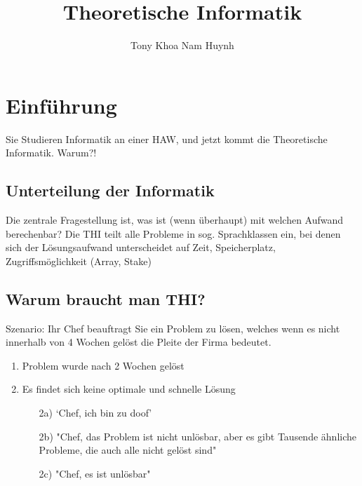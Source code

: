 \documentclass[11pt, a4paper]{article}
\title{Theoretische Informatik}
\author{Tony Khoa Nam Huynh}
\begin{document}
\maketitle
\thispagestyle{empty}   %

\newpage

\tableofcontents

\newpage

\section{Einführung}

Sie Studieren Informatik an einer HAW, und jetzt kommt die Theoretische Informatik.
Warum?!

\subsection{Unterteilung der Informatik}


Die zentrale Fragestellung ist, was ist (wenn überhaupt) mit welchen Aufwand berechenbar? Die THI teilt alle Probleme in sog. Sprachklassen ein, bei denen sich der Lösungsaufwand unterscheidet auf Zeit, Speicherplatz, Zugriffsmöglichkeit (Array, Stake)

\subsection{Warum braucht man THI?}

Szenario: Ihr Chef beauftragt Sie ein Problem zu lösen, welches wenn es nicht innerhalb von 4 Wochen gelöst die Pleite der Firma bedeutet.

\begin{enumerate}[1)]
    \item Problem wurde nach 2 Wochen gelöst
    \item Es findet sich keine optimale und schnelle Lösung
          \begin{enumerate}
              \item [2a)] `Chef, ich bin zu doof'
              \item [2b)] "Chef, das Problem ist nicht unlösbar, aber es gibt Tausende ähnliche Probleme, die auch alle nicht gelöst sind"
              \item [2c)] "Chef, es ist unlösbar"
          \end{enumerate}
\end{enumerate}
\end{document}
